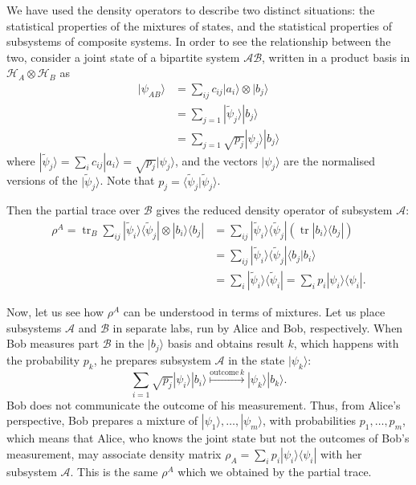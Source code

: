 \documentclass{article}
\begin{document}
We have used the density operators to describe two distinct situations: the statistical properties of the mixtures of states, and the statistical properties of subsystems of composite systems.
In order to see the relationship between the two, consider a joint state of a bipartite system \(\mathcal{AB}\), written in a product basis in \(\mathcal{H}_A\otimes\mathcal{H}_B\) as
\begin{equation}
  \begin{aligned}
    |\psi_{AB}\rangle
    &= \sum_{ij} c_{ij}|a_i\rangle\otimes|b_j\rangle
  \\&= \sum_{j=1} |\widetilde\psi_j\rangle|b_j\rangle
  \\&= \sum_{j=1} \sqrt{p_j}|\psi_j\rangle|b_j\rangle
  \end{aligned}
\label{eq:bipartite}
\end{equation}
where \(|\widetilde\psi_j\rangle = \sum_i c_{ij}|a_i\rangle = \sqrt{p_j}|\psi_j\rangle\), and the vectors \(|\psi_j\rangle\) are the normalised versions of the \(|\widetilde\psi_j\rangle\).
Note that \(p_j=\langle\widetilde\psi_j|\widetilde\psi_j\rangle\).

Then the partial trace over \(\mathcal{B}\) gives the reduced density operator of subsystem \(\mathcal{A}\):
\[
  \begin{aligned}
    \rho^A
    =\operatorname{tr}_B \sum_{ij} |\widetilde\psi_i\rangle\langle\widetilde\psi_j| \otimes |b_i\rangle\langle b_j|
    &= \sum_{ij} |\widetilde\psi_i\rangle\langle\widetilde\psi_j| (\operatorname{tr}|b_i\rangle\langle b_j|)
  \\&= \sum_{ij} |\widetilde\psi_i\rangle\langle\widetilde\psi_j| \langle b_j|b_i\rangle
  \\&= \sum_{i} |\widetilde\psi_i\rangle\langle\widetilde\psi_i|
    = \sum_{i} p_i |\psi_i\rangle\langle\psi_i|.
  \end{aligned}
\]

Now, let us see how \(\rho^A\) can be understood in terms of mixtures.
Let us place subsystems \(\mathcal{A}\) and \(\mathcal{B}\) in separate labs, run by Alice and Bob, respectively.
When Bob measures part \(\mathcal{B}\) in the \(|b_j\rangle\) basis and obtains result \(k\), which happens with the probability \(p_k\), he prepares subsystem \(\mathcal{A}\) in the state \(|\psi_k\rangle\):
\[
  \sum_{i=1} \sqrt{p_j}|\psi_i\rangle|b_i\rangle
  \overset{\mathrm{outcome}\,k}{\longmapsto}
  |\psi_k\rangle|b_k\rangle.
\]
Bob does not communicate the outcome of his measurement.
Thus, from Alice's perspective, Bob prepares a mixture of \(|\psi_1\rangle,\ldots,|\psi_m\rangle\), with probabilities \(p_1,\ldots,p_m\), which means that Alice, who knows the joint state but not the outcomes of Bob's measurement, may associate density matrix \(\rho_A=\sum_i p_i|\psi_i\rangle\langle\psi_i|\) with her subsystem \(\mathcal{A}\).
This is the same \(\rho^A\) which we obtained by the partial trace.
\end{document}

